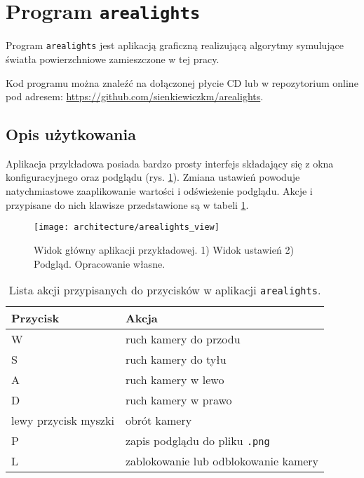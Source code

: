 \documentclass[../main.tex]{subfiles}
\begin{document}
\section{Program \texttt{arealights}}

Program \texttt{arealights} jest aplikacją graficzną realizującą algorytmy symulujące światła powierzchniowe zamieszczone w tej pracy.

Kod programu można znaleźć na dołączonej płycie CD lub w repozytorium online pod adresem: \url{https://github.com/sienkiewiczkm/arealights}.

\subsection{Opis użytkowania}

Aplikacja przykładowa posiada bardzo prosty interfejs składający się z okna konfiguracyjnego oraz podglądu (rys. \ref{fig:app_arealights_view}). Zmiana ustawień powoduje natychmiastowe zaaplikowanie wartości i odświeżenie podglądu. Akcje i przypisane do nich klawisze przedstawione są w tabeli \ref{tab:arealights_keybindings}.

\begin{figure}[h]
    \centering
    \texttt{[image: architecture/arealights\_view]}
    \caption{Widok główny aplikacji przykładowej. 1) Widok ustawień 2) Podgląd. Opracowanie własne.}
    \label{fig:app_arealights_view}
\end{figure}

\begin{table}[h]
    \centering
    \begin{tabular}{|l|l|}
        \hline \textbf{Przycisk} & \textbf{Akcja} \\ \hline
        W & ruch kamery do przodu \\ \hline
        S & ruch kamery do tyłu \\ \hline
        A & ruch kamery w lewo \\ \hline
        D & ruch kamery w prawo \\ \hline
        lewy przycisk myszki & obrót kamery \\ \hline
        P & zapis podglądu do pliku \texttt{.png} \\ \hline
        L & zablokowanie lub odblokowanie kamery \\ \hline
    \end{tabular}
    
    \caption{Lista akcji przypisanych do przycisków w aplikacji \texttt{arealights}.}
    \label{tab:arealights_keybindings}
\end{table}
\end{document}
